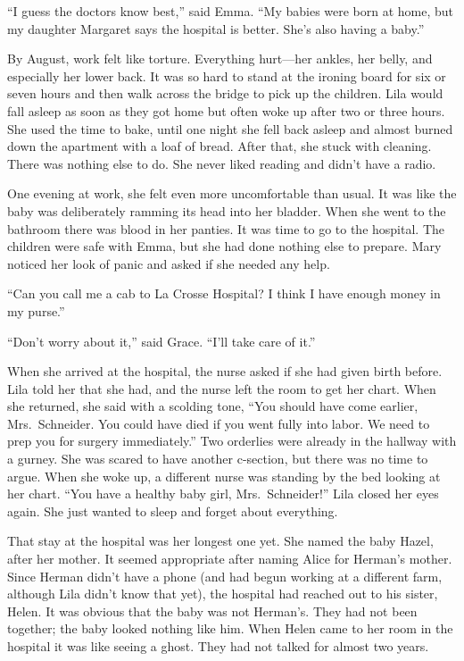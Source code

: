 \documentclass[
  letterpaper,
]{book}
\begin{document}
``I guess the doctors know best,'' said Emma. ``My babies were born at
home, but my daughter Margaret says the hospital is better. She's also
having a baby.''

By August, work felt like torture. Everything hurt---her ankles, her
belly, and especially her lower back. It was so hard to stand at the
ironing board for six or seven hours and then walk across the bridge to
pick up the children. Lila would fall asleep as soon as they got home
but often woke up after two or three hours. She used the time to bake,
until one night she fell back asleep and almost burned down the
apartment with a loaf of bread. After that, she stuck with cleaning.
There was nothing else to do. She never liked reading and didn't have a
radio.

One evening at work, she felt even more uncomfortable than usual. It was
like the baby was deliberately ramming its head into her bladder. When
she went to the bathroom there was blood in her panties. It was time to
go to the hospital. The children were safe with Emma, but she had done
nothing else to prepare. Mary noticed her look of panic and asked if she
needed any help.

``Can you call me a cab to La Crosse Hospital? I think I have enough
money in my purse.''

``Don't worry about it,'' said Grace. ``I'll take care of it.''

When she arrived at the hospital, the nurse asked if she had given birth
before. Lila told her that she had, and the nurse left the room to get
her chart. When she returned, she said with a scolding tone, ``You
should have come earlier, Mrs.~Schneider. You could have died if you
went fully into labor. We need to prep you for surgery immediately.''
Two orderlies were already in the hallway with a gurney. She was scared
to have another c-section, but there was no time to argue. When she woke
up, a different nurse was standing by the bed looking at her chart.
``You have a healthy baby girl, Mrs.~Schneider!'' Lila closed her eyes
again. She just wanted to sleep and forget about everything.

That stay at the hospital was her longest one yet. She named the baby
Hazel, after her mother. It seemed appropriate after naming Alice for
Herman's mother. Since Herman didn't have a phone (and had begun working
at a different farm, although Lila didn't know that yet), the hospital
had reached out to his sister, Helen. It was obvious that the baby was
not Herman's. They had not been together; the baby looked nothing like
him. When Helen came to her room in the hospital it was like seeing a
ghost. They had not talked for almost two years.
\end{document}
